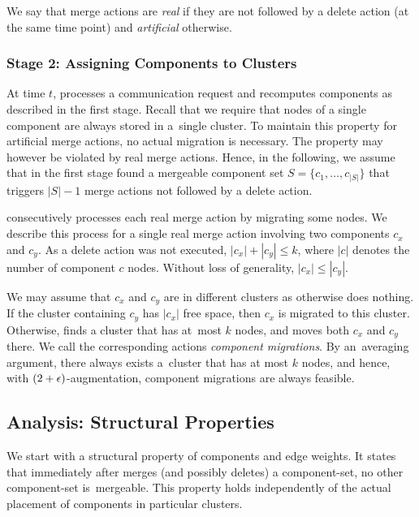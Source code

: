 We say that merge actions are \emph{real} if they are not followed
by a delete action (at the same time point) and \emph{artificial} otherwise. 



\subsubsection{Stage 2: Assigning Components to Clusters}

At time $t$, \CREP processes a communication request and recomputes components
as described in the first stage. Recall that we require that nodes of a single
component are always stored in a~single cluster. To maintain this property for
artificial merge actions, no actual migration is necessary. The property may
however be violated by real merge actions. Hence, in the following, we assume
that in the first stage \CREP found a mergeable component set $S = \{ c_1, 
\ldots, c_{|S|} \}$ that triggers $|S|-1$ merge actions not 
followed by a delete action.

\CREP consecutively processes each real merge action by migrating some nodes.
We describe this process for a single real merge action involving two
components $c_x$ and $c_y$. As a delete action was not executed, $|c_x| +
|c_y| \leq k$, where $|c|$ denotes the number of component $c$ nodes.
Without loss of generality, $|c_x| \leq |c_y|$.

We may assume that $c_x$ and $c_y$ are in different clusters as otherwise
\CREP does nothing. If the cluster containing $c_y$ has $|c_x|$ free space,
then $c_x$ is migrated to this cluster. Otherwise, \CREP finds a cluster that
has at~most $k$ nodes, and moves both $c_x$ and $c_y$ there. We call the
corresponding actions \emph{component migrations}. By an~averaging argument,
there always exists a~cluster that has at most $k$ nodes, and hence, with
$(2+\epsilon)$-augmentation, component migrations are always feasible.



\subsection{Analysis: Structural Properties}

We start with a structural property of components and edge weights.
It states that immediately after \CREP merges (and
possibly deletes) a component-set, no other component-set is~mergeable. This
property holds independently of the actual placement of components in
particular clusters.

